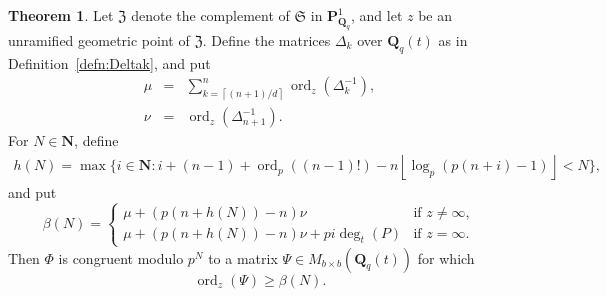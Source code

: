 \documentclass[a4paper,11pt]{article}
\numberwithin{equation}{section}
\providecommand{\floor}[1]{\left\lfloor#1\right\rfloor}   %
\providecommand{\ceil}[1]{\left\lceil#1\right\rceil}   %
\newcommand{\NN}{\mathbf{N}} %
\newcommand{\QQ}{\mathbf{Q}} %
\DeclareMathOperator{\ord}{ord}          %
\theoremstyle{definition}
\newtheorem{thm}{Theorem}[section]
\begin{document}
\begin{thm} \label{thm:Gerkmann}
Let $\mathfrak{Z}$ denote the complement of $\mathfrak{S}$ in 
$\mathbf{P}^{1}_{\mathbf{Q}_q}$, and let $z$ be an unramified geometric point 
of $\mathfrak{Z}$. Define the matrices $\Delta_k$ over $\QQ_q(t)$ as in 
Definition~\ref{defn:Deltak}, and put
\begin{eqnarray*}
\mu &=& \sum_{k=\ceil{(n+1)/d}}^n \ord_z(\Delta_k^{-1}), \\
\nu &=& \ord_z(\Delta_{n+1}^{-1}).
\end{eqnarray*}
For $N \in \NN$, define 
\begin{align*}
h(N) = \max \{ i \in \NN : i+(n-1)+\ord_p ((n-1)!)-n \floor{\log_p(p(n+i)-1)} < N \},
\end{align*}
and put
\[
\beta(N) = \begin{cases}
\mu +(p(n+h(N))-n) \nu & \mbox{if $z \neq \infty$}, \\
\mu +(p(n+h(N))-n) \nu + pi \deg_t(P) & \mbox{if $z = \infty$}.
\end{cases}
\]
Then $\Phi$ is congruent modulo $p^N$ to a matrix 
$\Psi \in M_{b \times b}(\QQ_q(t))$ for which
\begin{equation*}
\ord_z(\Psi) \geq \beta(N).
\end{equation*}
\end{thm}
\end{document}
